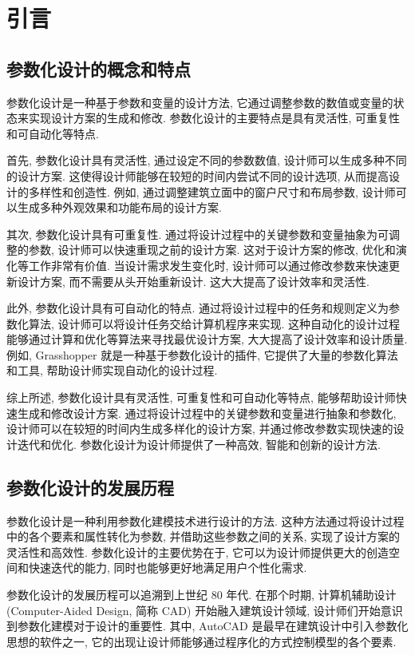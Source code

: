 
\section{引言}

\subsection{参数化设计的概念和特点}

参数化设计是一种基于参数和变量的设计方法, 它通过调整参数的数值或变量的状态来实现设计方案的生成和修改.
参数化设计的主要特点是具有灵活性, 可重复性和可自动化等特点.

首先, 参数化设计具有灵活性, 通过设定不同的参数数值, 设计师可以生成多种不同的设计方案.
这使得设计师能够在较短的时间内尝试不同的设计选项, 从而提高设计的多样性和创造性.
例如, 通过调整建筑立面中的窗户尺寸和布局参数, 设计师可以生成多种外观效果和功能布局的设计方案.

其次, 参数化设计具有可重复性.
通过将设计过程中的关键参数和变量抽象为可调整的参数, 设计师可以快速重现之前的设计方案.
这对于设计方案的修改, 优化和演化等工作非常有价值.
当设计需求发生变化时, 设计师可以通过修改参数来快速更新设计方案, 而不需要从头开始重新设计.
这大大提高了设计效率和灵活性.

此外, 参数化设计具有可自动化的特点.
通过将设计过程中的任务和规则定义为参数化算法, 设计师可以将设计任务交给计算机程序来实现.
这种自动化的设计过程能够通过计算和优化等算法来寻找最优设计方案, 大大提高了设计效率和设计质量.
例如, Grasshopper 就是一种基于参数化设计的插件, 它提供了大量的参数化算法和工具, 帮助设计师实现自动化的设计过程.

综上所述, 参数化设计具有灵活性, 可重复性和可自动化等特点, 能够帮助设计师快速生成和修改设计方案.
通过将设计过程中的关键参数和变量进行抽象和参数化, 设计师可以在较短的时间内生成多样化的设计方案, 并通过修改参数实现快速的设计迭代和优化.
参数化设计为设计师提供了一种高效, 智能和创新的设计方法.

\subsection{参数化设计的发展历程}

参数化设计是一种利用参数化建模技术进行设计的方法.
这种方法通过将设计过程中的各个要素和属性转化为参数, 并借助这些参数之间的关系, 实现了设计方案的灵活性和高效性.
参数化设计的主要优势在于, 它可以为设计师提供更大的创造空间和快速迭代的能力, 同时也能够更好地满足用户个性化需求.

参数化设计的发展历程可以追溯到上世纪 80 年代.
在那个时期, 计算机辅助设计 (Computer-Aided Design, 简称 CAD) 开始融入建筑设计领域, 设计师们开始意识到参数化建模对于设计的重要性.
其中, AutoCAD 是最早在建筑设计中引入参数化思想的软件之一, 它的出现让设计师能够通过程序化的方式控制模型的各个要素.

